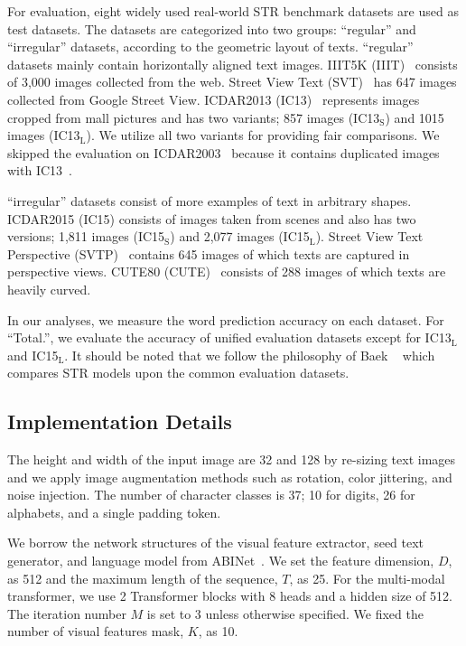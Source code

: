 \documentclass[runningheads]{llncs}
\begin{document}
For evaluation, eight widely used real-world STR benchmark datasets are used as test datasets. The datasets are categorized into two groups: ``regular'' and ``irregular'' datasets, according to the geometric layout of texts.  ``regular'' datasets mainly contain horizontally aligned text images. IIIT5K (IIIT)~\cite{IIIT5k} consists of 3,000 images collected from the web. Street View Text (SVT)~\cite{SVT} has 647 images collected from Google Street View. ICDAR2013 (IC13)~\cite{IC13} represents images cropped from mall pictures and has two variants; 857 images (IC13$_\text{S}$) and 1015 images (IC13$_\text{L}$). We utilize all two variants for providing fair comparisons. We skipped the evaluation  on ICDAR2003~\cite{IC03} because it contains duplicated images with IC13~\cite{Baek_2019_ICCV_CombBest}.

``irregular'' datasets consist of more examples of text in arbitrary shapes. 
ICDAR2015 (IC15) consists of images taken from scenes and also has two versions; 1,811 images (IC15$_\text{S}$) and 2,077 images (IC15$_\text{L}$). Street View Text Perspective (SVTP)~\cite{SVTP} contains 645 images of which texts are captured in perspective views. CUTE80 (CUTE)~\cite{CUTE80} consists of 288 images of which texts are heavily curved. 

In our analyses, we measure the word prediction accuracy on each dataset.
For ``Total.'', we evaluate the accuracy of unified evaluation datasets except for IC13$_\text{L}$ and IC15$_\text{L}$. It should be noted that we follow the philosophy of Baek \etal~\cite{Baek_2019_ICCV_CombBest} which compares STR models upon the common evaluation datasets.

\subsection{Implementation Details}
\label{sec:implementaion}

The height and width of the input image are 32 and 128 by re-sizing text images and we apply image augmentation methods \cite{ABINet,lyu2018mask,Yu_2020_CVPR_SRN} such as rotation, color jittering, and noise injection. The number of character classes is 37; 10 for digits, 26 for alphabets, and a single padding token.

We borrow the network structures of the visual feature extractor, seed text generator, and language model from ABINet~\cite{ABINet}. We set the feature dimension, $D$, as 512 and the maximum length of the sequence, $T$, as 25. For the multi-modal transformer, we use 2 Transformer blocks with 8 heads and a hidden size of 512. The iteration number $M$ is set to 3 unless otherwise specified. We fixed the number of visual features mask, $K$, as 10.
\end{document}
